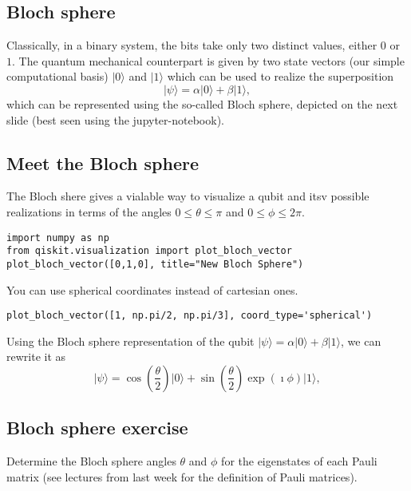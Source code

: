 \subsection{Bloch sphere}

Classically, in a binary system, the bits take only two distinct
values, either $0$ or $1$.  The quantum mechanical counterpart is
given by two state vectors (our simple computational basis)
$\vert 0 \rangle$ and $\vert 1\rangle $ which can be used to realize the
superposition
\[
\vert \psi \rangle = \alpha \vert 0 \rangle +\beta\vert 1\rangle, 
\]
which can be represented using the so-called Bloch sphere, depicted on the next slide (best seen using the jupyter-notebook).

\subsection{Meet the Bloch sphere}
The Bloch shere gives a vialable way to visualize a qubit and itsv possible realizations in terms of the angles $0\le \theta \le \pi$ and
$0\le \phi \le 2\pi$. 




\begin{Verbatim}[numbers=none,fontsize=\fontsize{9pt}{9pt},baselinestretch=0.95]
import numpy as np
from qiskit.visualization import plot_bloch_vector
plot_bloch_vector([0,1,0], title="New Bloch Sphere")

\end{Verbatim}

You can use spherical coordinates instead of cartesian ones.


\begin{Verbatim}[numbers=none,fontsize=\fontsize{9pt}{9pt},baselinestretch=0.95]
plot_bloch_vector([1, np.pi/2, np.pi/3], coord_type='spherical')

\end{Verbatim}

Using the Bloch sphere representation of the qubit $\vert \psi \rangle = \alpha \vert 0 \rangle +\beta\vert 1\rangle$, we can rewrite it as
\[
\vert \psi \rangle = \cos{(\frac{\theta}{2})} \vert 0 \rangle +\sin{(\frac{\theta}{2})}\exp{(\imath\phi)}\vert 1\rangle, 
\]

\subsection{Bloch sphere exercise}

Determine the Bloch sphere angles $\theta$ and $\phi$ for the eigenstates of each Pauli matrix (see lectures from last week for the definition of Pauli matrices).

